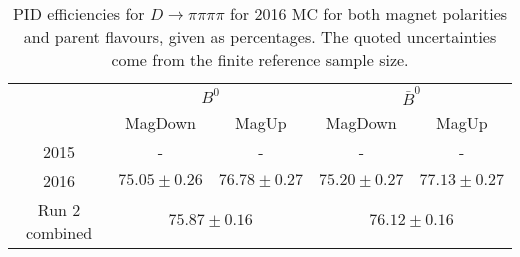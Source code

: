\begin{table}[H]
    \centering
    \begin{tabular}{ccccc}
        \toprule
        & \multicolumn{2}{c}{$B^0$} &  \multicolumn{2}{c}{$\bar{B}^0$}\\
        & MagDown & MagUp & MagDown & MagUp\\
        \midrule
2015 & - & - & - & - \\
2016 & $75.05 \pm 0.26$ & $76.78 \pm 0.27$ & $75.20 \pm 0.27$ & $77.13 \pm 0.27$ \\
        \midrule
Run 2 combined & \multicolumn{2}{c}{$75.87 \pm 0.16$} & \multicolumn{2}{c}{$76.12 \pm 0.16$} \\
        \bottomrule
    \end{tabular}
    \caption{PID efficiencies for $D \to \pi\pi\pi\pi$ for 2016 MC for both magnet polarities and parent flavours, given as percentages. The quoted  uncertainties come from the finite reference sample size.}
\label{tab:PID_efficiency_pipipipi}
\end{table}
